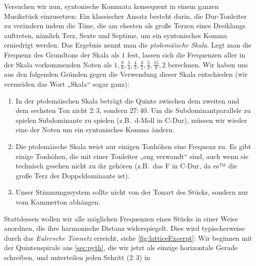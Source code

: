 \documentclass[british,11pt]{scrartcl}
\begin{document}
Versuchen wir nun, syntonische Kommata konsequent in einem ganzen Musikstück
einzusetzen: Ein klassischer Ansatz besteht darin, die Dur-Tonleiter zu
verändern indem die Töne, die am ehesten als große Terzen eines Dreiklangs
auftreten, nämlich Terz, Sexte und Septime, um ein syntonisches Komma erniedrigt
werden. Das Ergebnis nennt man die \emph{ptolemäische Skala}. Legt man die
Frequenz des Grundtons der Skala als $1$ fest, lassen sich die Frequenzen aller
in der Skala vorkommenden Noten als 
$1,\frac98,\frac54,\frac43,\frac32,\frac53,\frac{15}8,2$ berechnen. Wir haben uns aus den folgenden Gründen gegen die Verwendung dieser Skala entschieden
(wir vermeiden das Wort „Skala“ sogar ganz):
\begin{enumerate}
\item In der ptolemäischen Skala beträgt die Quinte zwischen dem zweiten und dem
  sechsten Ton nicht $2:3$, sondern $27:40$. Um die Subdominantparallele zu 
  spielen Subdominante zu spielen (z.B.\ d-Moll in C-Dur), müssen wir wieder 
  eine der Noten um ein syntonisches Komma ändern.
\item Die ptolemäische Skala weist nur einigen Tonhöhen eine Frequenz zu. Es 
  gibt einige Tonhöhen, die mit einer Tonleiter „eng verwandt“ sind, auch wenn
  sie technisch gesehen nicht zu ihr gehören (z.B.\ das \sharp F in C-Dur, da
  es™ die große Terz der Doppeldominante ist).
\item Unser Stimmungssystem sollte nicht von der Tonart des Stücks, sondern nur
  vom Kammerton abhängen.
\end{enumerate}
Stattdessen wollen wir alle möglichen Frequenzen eines Stücks in einer Weise
anordnen, die ihre harmonische Distanz widerspiegelt. Dies wird typischerweise
durch das \emph{Eulersche Tonnetz} erreicht, siehe \cref{fig:latticeExcerpt}:
Wir beginnen mit der Quintenspirale aus \ref{sec:pyth}, die wir jetzt als
einzige horizontale Gerade schreiben, und unterteilen jeden Schritt ($2:3$) in
\end{document}
